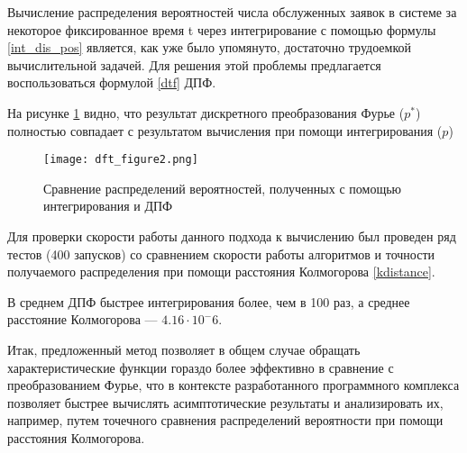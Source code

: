 Вычисление распределения вероятностей числа обслуженных заявок в системе за некоторое фиксированное время t через интегрирование с помощью формулы \eqref{int_dis_pos} является, как уже было упомянуто, достаточно трудоемкой вычислительной задачей. Для решения этой проблемы предлагается воспользоваться формулой \eqref{dtf} ДПФ.

На рисунке \ref{dft_figure2z} видно, что результат дискретного преобразования Фурье ($p^*$) полностью совпадает с результатом вычисления при помощи интегрирования ($p$)
\begin{figure}[H]
	\centering
	\texttt{[image: dft\_figure2.png]}
	\caption{Сравнение распределений вероятностей, полученных с помощью интегрирования и ДПФ}
	\label{dft_figure2z}
\end{figure}

Для проверки скорости работы данного подхода к вычислению был проведен ряд тестов (400 запусков) со сравнением скорости работы алгоритмов и точности получаемого распределения при помощи расстояния Колмогорова \eqref{kdistance}.

В среднем ДПФ быстрее интегрирования более, чем в 100 раз, а среднее расстояние Колмогорова --- $4.16 \cdot 10^-6$.

Итак, предложенный метод позволяет в общем случае обращать характеристические функции гораздо более эффективно в сравнение с преобразованием Фурье, что в контексте разработанного программного комплекса позволяет быстрее вычислять асимптотические результаты и анализировать их, например, путем точечного сравнения распределений вероятности при помощи расстояния Колмогорова.


\clearpage
